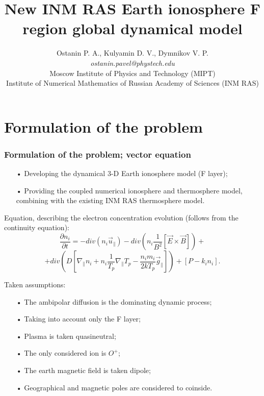 \documentclass[9pt, apectratio=43,unicode]{beamer}
\title[New INM RAS Earth ionosphere F region global dynamical model]{New INM RAS Earth ionosphere F region global dynamical model}
\author[Ostanin P. A.]{Ostanin P. A., Kulyamin D. V., Dymnikov V. P. \\ \smallskip \textit{ostanin.pavel@phystech.edu} \\ \smallskip Moscow Institute of Physics and Technology (MIPT)\\ Institute of Numerical Mathematics of Russian Academy of Sciences (INM RAS)}
\date{ }
\begin{document}
\begin{frame}[plain]
\titlepage
\end{frame}

\def\L{\mathcal{L}}

\section{Formulation of the problem}
\begin{frame}\frametitle{Formulation of the problem; vector equation}
\begin{itemize}
\item[•] Developing the dynamical 3-D Earth ionosphere model (F layer);
\item[•] Providing the coupled numerical ionosphere and thermosphere model, combining with the existing INM RAS thermosphere model.
\end{itemize}

Equation, describing the electron concentration evolution (follows from the continuity equation): $$\dfrac{\partial n_i}{\partial t} = -div(n_i \vec{u}_\parallel)-div\left(n_i\dfrac{1}{B^2}[\vec{E}\times \vec{B}] \right)+$$ $$+div\left(D\left[\nabla_\parallel n_i +n_i\dfrac{1}{T_p}\nabla_\parallel T_p - \dfrac{n_i m_i}{2kT_p}\vec{g}_\parallel\right]\right)+[P-k_in_i].$$

Taken assumptions:
\begin{itemize}
\item[•] The ambipolar diffusion is the dominating dynamic process;
\item[•] Taking into account only the F layer;
\item[•] Plasma is taken quasineutral;
\item[•] The only considered ion is $O^+$;
\item[•] The earth magnetic field is taken dipole;
\item[•] Geographical and magnetic poles are considered to coinside.
\end{itemize}


\end{frame}
\end{document}
